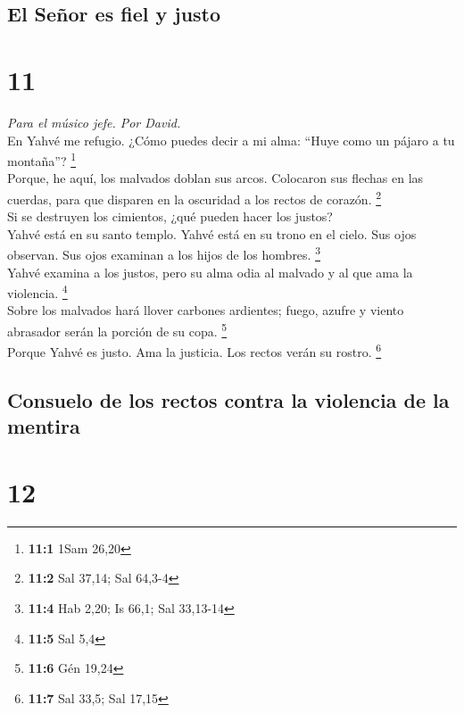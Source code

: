 \hypertarget{el-seuxf1or-es-fiel-y-justo}{%
\subsection{El Señor es fiel y
justo}\label{el-seuxf1or-es-fiel-y-justo}}

\hypertarget{section-10}{%
\section{11}\label{section-10}}

\emph{Para el músico jefe. Por David.}\\
 En Yahvé me refugio. ¿Cómo puedes decir a mi alma: ``Huye
como un pájaro a tu montaña''? \footnote{\textbf{11:1} 1Sam 26,20}\\
 Porque, he aquí, los malvados doblan sus arcos. Colocaron
sus flechas en las cuerdas, para que disparen en la oscuridad a los
rectos de corazón. \footnote{\textbf{11:2} Sal 37,14; Sal 64,3-4}\\
 Si se destruyen los cimientos, ¿qué pueden hacer los
justos?\\
 Yahvé está en su santo templo. Yahvé está en su trono en
el cielo. Sus ojos observan. Sus ojos examinan a los hijos de los
hombres. \footnote{\textbf{11:4} Hab 2,20; Is 66,1; Sal 33,13-14}\\
 Yahvé examina a los justos, pero su alma odia al malvado
y al que ama la violencia. \footnote{\textbf{11:5} Sal 5,4}\\
 Sobre los malvados hará llover carbones ardientes; fuego,
azufre y viento abrasador serán la porción de su copa. \footnote{\textbf{11:6}
  Gén 19,24}\\
 Porque Yahvé es justo. Ama la justicia. Los rectos verán
su rostro. \footnote{\textbf{11:7} Sal 33,5; Sal 17,15}

\hypertarget{consuelo-de-los-rectos-contra-la-violencia-de-la-mentira}{%
\subsection{Consuelo de los rectos contra la violencia de la
mentira}\label{consuelo-de-los-rectos-contra-la-violencia-de-la-mentira}}

\hypertarget{section-11}{%
\section{12}\label{section-11}}

